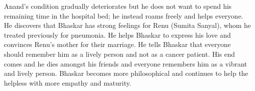 \documentclass[11pt]{article}
\begin{document}
Anand's condition gradually deteriorates but he does not want to spend his remaining time in the 
hospital bed; he instead roams freely and helps everyone. He discovers that Bhaskar has strong 
feelings for Renu (Sumita Sanyal), whom he treated previously for pneumonia. He helps Bhaskar to
express his love and convinces Renu's mother for their marriage. He tells Bhaskar that everyone
should remember him as a lively person and not as a cancer patient. His end comes and he dies 
amongst his friends and everyone remembers him as a vibrant and lively person. Bhaskar becomes
more philosophical and continues to help the helpless with more empathy and maturity.
\end{document}
